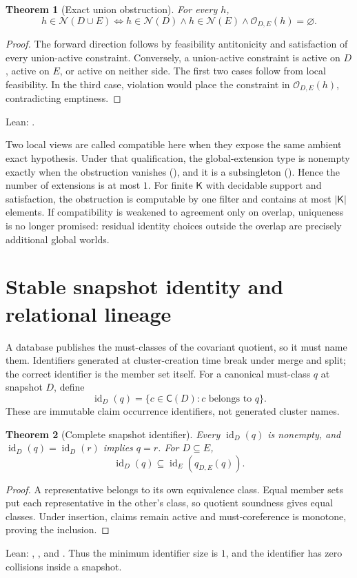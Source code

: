 \documentclass[11pt]{article}
\newtheorem{theorem}{Theorem}[section]
\theoremstyle{definition}
\theoremstyle{remark}
\newcommand{\Feas}{\mathcal N}
\newcommand{\Claims}{\mathsf C}
\newcommand{\Constraints}{\mathsf K}
\begin{document}
\begin{theorem}[Exact union obstruction]
For every $h$,
\[
 h\in\Feas(D\cup E)
 \Longleftrightarrow
 h\in\Feas(D)\land h\in\Feas(E)\land
 \mathcal O_{D,E}(h)=\varnothing.
\]
\end{theorem}
\begin{proof}
The forward direction follows by feasibility antitonicity and satisfaction of
every union-active constraint.  Conversely, a union-active constraint is
active on $D$, active on $E$, or active on neither side.  The first two cases
follow from local feasibility.  In the third case, violation would place the
constraint in $\mathcal O_{D,E}(h)$, contradicting emptiness.
\end{proof}
\noindent Lean: .

Two local views are called compatible here when they expose the same ambient
exact hypothesis.  Under that qualification, the global-extension type is
nonempty exactly when the obstruction vanishes
(), and it is a subsingleton
().  Hence the number of extensions is at
most $1$.  For finite $\Constraints$ with decidable support and satisfaction,
the obstruction is computable by one filter and contains at most
$|\Constraints|$ elements.  If compatibility is weakened to agreement only on
overlap, uniqueness is no longer promised: residual identity choices outside
the overlap are precisely additional global worlds.

\section{Stable snapshot identity and relational lineage}\label{sec:lineage}

A database publishes the must-classes of the covariant quotient, so it must
name them.  Identifiers generated at cluster-creation time break under merge
and split; the correct identifier is the member set itself.  For a canonical
must-class $q$ at snapshot $D$, define
\[
  \operatorname{id}_D(q)=
  \{c\in\Claims(D):c\text{ belongs to }q\}.
\]
These are immutable claim occurrence identifiers, not generated cluster names.

\begin{theorem}[Complete snapshot identifier]
Every $\operatorname{id}_D(q)$ is nonempty, and
$\operatorname{id}_D(q)=\operatorname{id}_D(r)$ implies $q=r$.
For $D\subseteq E$,
\[
 \operatorname{id}_D(q)\subseteq
 \operatorname{id}_E(q_{D,E}(q)).
\]
\end{theorem}
\begin{proof}
A representative belongs to its own equivalence class.  Equal member sets put
each representative in the other's class, so quotient soundness gives equal
classes.  Under insertion, claims remain active and must-coreference is
monotone, proving the inclusion.
\end{proof}
\noindent Lean: ,
, and
.  Thus the minimum identifier size is $1$,
and the identifier has zero collisions inside a snapshot.
\end{document}
